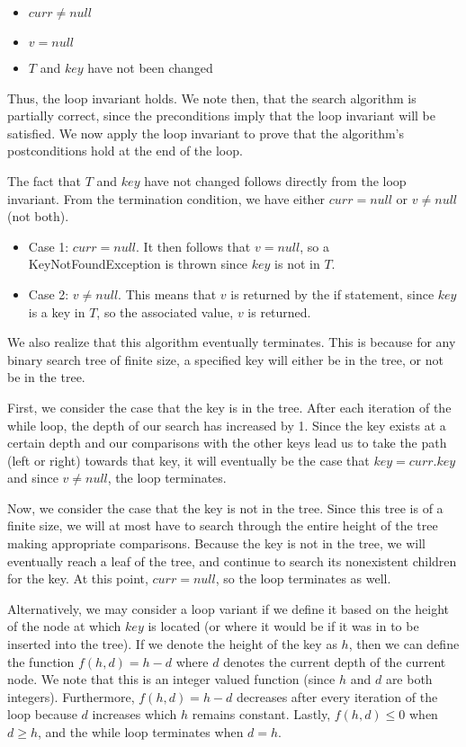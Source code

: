\documentclass[11pt]{article}
\theoremstyle{plain} %
\theoremstyle{definition}
\theoremstyle{example}
\theoremstyle{remark}
\begin{document}
\begin{itemize}
\item $curr \neq null$
\item $v = null$
\item $T$ and $key$ have not been changed
\end{itemize}

Thus, the loop invariant holds. We note then, that the search algorithm is partially correct, since the preconditions imply that the loop invariant will be satisfied. We now apply the loop invariant to prove that the algorithm's postconditions hold at the end of the loop.

The fact that $T$ and $key$ have not changed follows directly from the loop invariant. From the termination condition, we have either $curr = null$ or $v \neq null$ (not both). 

\begin{itemize}
\item Case 1: $curr = null$. It then follows that $v=null$, so a KeyNotFoundException is thrown since $key$ is not in $T$.
\item Case 2: $v \neq null$. This means that $v$ is returned by the if statement, since $key$ is a key in $T$, so the associated value, $v$ is returned.
\end{itemize}

We also realize that this algorithm eventually terminates. This is because for any binary search tree of finite size, a specified key will either be in the tree, or not be in the tree. 

First, we consider the case that the key is in the tree. After each iteration of the while loop, the depth of our search has increased by 1. Since the key exists at a certain depth and our comparisons with the other keys lead us to take the path (left or right) towards that key, it will eventually be the case that $key = curr.key$ and since $v \neq null$, the loop terminates. 

Now, we consider the case that the key is not in the tree. Since this tree is of a finite size, we will at most have to search through the entire height of the tree making appropriate comparisons. Because the key is not in the tree, we will eventually reach a leaf of the tree, and continue to search its nonexistent children for the key. At this point, $curr = null$, so the loop terminates as well.

Alternatively, we may consider a loop variant if we define it based on the height of the node at which $key$ is located (or where it would be if it was in to be inserted into the tree). If we denote the height of the key as $h$, then we can define the function $f(h,d) = h-d$ where $d$ denotes the current depth of the current node. We note that this is an integer valued function (since $h$ and $d$ are both integers). Furthermore, $f(h,d) = h-d$ decreases after every iteration of the loop because $d$ increases which $h$ remains constant. Lastly, $f(h,d) \leq 0$ when $d \geq h$, and the while loop terminates when $d = h$.
\\
\end{document}

